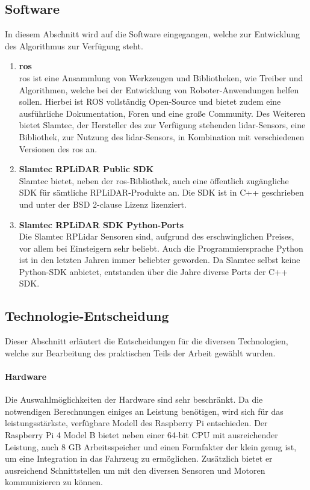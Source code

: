 \subsection{Software}
In diesem Abschnitt wird auf die Software eingegangen, welche zur Entwicklung des Algorithmus zur Verfügung steht.

\begin{enumerate}[leftmargin=*]
    \item \textbf{\acf{ros}} \\
    \ac{ros} ist eine Ansammlung von Werkzeugen und Bibliotheken, wie Treiber und Algorithmen, welche bei der Entwicklung von Roboter-Anwendungen helfen sollen. 
    Hierbei ist ROS vollständig Open-Source und bietet zudem eine ausführliche Dokumentation, Foren und eine große Community. \cite{Ros2024}
    Des Weiteren bietet Slamtec, der Hersteller des zur Verfügung stehenden \ac{lidar}-Sensors, eine Bibliothek, zur Nutzung des \ac{lidar}-Sensors, in Kombination mit verschiedenen Versionen des \ac{ros} an. \cite{RplidarRos2023}

    \item \textbf{Slamtec RPLiDAR Public SDK} \\
    Slamtec bietet, neben der \ac{ros}-Bibliothek, auch eine öffentlich zugängliche SDK für sämtliche RPLiDAR-Produkte an. 
    Die SDK ist in C++ geschrieben und unter der BSD 2-clause Lizenz lizenziert. \cite{RplidarSDK2023}

    \item \textbf{Slamtec RPLiDAR SDK Python-Ports} \\
    Die Slamtec RPLidar Sensoren sind, aufgrund des erschwinglichen Preises, vor allem bei Einsteigern sehr beliebt.
    Auch die Programmiersprache Python ist in den letzten Jahren immer beliebter geworden.
    Da Slamtec selbst keine Python-SDK anbietet, entstanden über die Jahre diverse Ports der C++ SDK.
\end{enumerate}

\subsection{Technologie-Entscheidung}
Dieser Abschnitt erläutert die Entscheidungen für die diversen Technologien, welche zur Bearbeitung des praktischen Teils der Arbeit gewählt wurden.
\paragraph{Hardware}
Die Auswahlmöglichkeiten der Hardware sind sehr beschränkt.
Da die notwendigen Berechnungen einiges an Leistung benötigen, wird sich für das leistungsstärkste, verfügbare Modell des Raspberry Pi entschieden.
Der Raspberry Pi 4 Model B bietet neben einer 64-bit CPU mit ausreichender Leistung, auch 8 GB Arbeitsspeicher und einen Formfakter der klein genug ist, um eine Integration in das Fahrzeug zu ermöglichen.
Zusätzlich bietet er ausreichend Schnittstellen um mit den diversen Sensoren und Motoren kommunizieren zu können.

